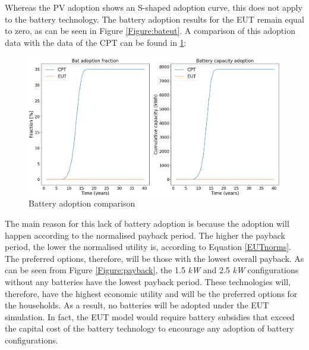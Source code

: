 \noindent
Whereas the PV adoption shows an S-shaped adoption curve, this does not apply to the battery technology. The battery adoption results for the EUT remain equal to zero, as can be seen in Figure \ref{Figure:bateut}. A comparison of this adoption data with the data of the CPT can be found in \ref{Figure:batcompar}:
\begin{figure}[h!]
\centering
\includegraphics[width=12cm]{EUTCompar/Bat.png}
\caption{Battery adoption comparison}
\label{Figure:batcompar}
\end{figure}
\noindent
The main reason for this lack of battery adoption is because the adoption will happen according to the normalised payback period. The higher the payback period, the lower the normalised utility is, according to Equation \ref{EUTnorms}. The preferred options, therefore, will be those with the lowest overall payback. As can be seen from Figure \ref{Figure:payback}, the 1.5 \textit{kW} and 2.5 \textit{kW} configurations without any batteries have the lowest payback period. These technologies will, therefore, have the highest economic utility and will be the preferred options for the households. As a result, no batteries will be adopted under the EUT simulation. In fact, the EUT model would require battery subsidies that exceed the capital cost of the battery technology to encourage any adoption of battery configurations.
\newline 
